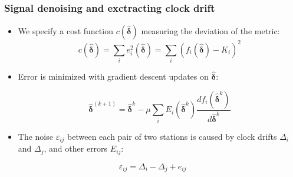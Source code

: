 \documentclass{beamer}
\begin{document}
\begin{frame}
\frametitle{Signal denoising and exctracting clock drift}
\begin{itemize}
\item We specify a cost function $c(\bm{\hat{\delta}})$ measuring the deviation of the metric:
\begin{equation}
c(\bm{\hat{\delta}}) = \sum_i e_i^2(\bm{\hat{\delta}}) = \sum_i(f_i(\bm{\hat{\delta}})-K_i)^2
\end{equation}

\item Error is minimized with gradient descent updates on $\bm{\hat{\delta}}$: 

\begin{equation}
\bm{\hat{\delta}}^{(k+1)} = \bm{\hat{\delta}}^k-\mu\sum_i E_i(\bm{\hat{\delta}}^k)\frac{df_i(\bm{\hat{\delta}}^k)}{d\bm{\hat{\delta}}^k}
\label{eq:updates}
\end{equation}

\item The noise $\varepsilon_{ij}$ between each pair of two stations is caused by clock drifts $\Delta_i$ and $\Delta_j$, and other errors $E_{ij}$:
\end{itemize}
\begin{equation}
\varepsilon_{ij} = \Delta_i - \Delta_j + e_{ij}
\end{equation}

\end{frame}
\end{document}
